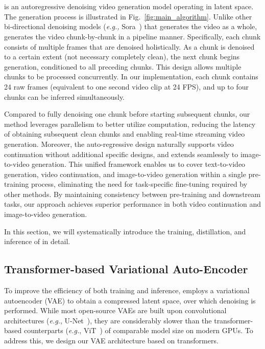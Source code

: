 \section{\magi}

\magi is an autoregressive denoising video generation model operating in latent space. The generation process is illustrated in Fig.~\ref{fig:main_algorithm}. Unlike other bi-directional denoising models (\emph{e.g.,} Sora~\citep{openaisora2024}) that generates the video as a whole, \magi generates the video chunk-by-chunk in a pipeline manner. Specifically, each chunk consists of multiple frames that are denoised holistically. As a chunk is denoised to a certain extent (not necessary completely clean), the next chunk begins generation, conditioned to all preceding chunks. This design allows multiple chunks to be processed concurrently. In our implementation, each chunk contains 24 raw frames (equivalent to one second video clip at 24 FPS), and up to four chunks can be inferred simultaneously.

Compared to fully denoising one chunk before starting subsequent chunks, our method leverages parallelism to better utilize computation, reducing the latency of obtaining subsequent clean chunks and enabling real-time streaming video generation. Moreover, the auto-regressive design naturally supports video continuation without additional specific designs, and extends seamlessly to image-to-video generation. This unified framework enables us to cover text-to-video generation, video continuation, and image-to-video generation within a single pre-training process, eliminating the need for task-specific fine-tuning required by other methods. By maintaining consistency between pre-training and downstream tasks, our approach achieves superior performance in both video continuation and image-to-video generation. 

In this section, we will systematically introduce the training, distillation, and inference of \magi in detail.


\subsection{Transformer-based Variational Auto-Encoder}
To improve the efficiency of both training and inference, \magi employs a variational autoencoder (VAE) to obtain a compressed latent space, over which denoising is performed. While most open-source VAEs are built upon convolutional architectures (\emph{e.g.}, U-Net~\citep{ronneberger2015u}), they are considerably slower than the transformer-based counterparts (\emph{e.g.}, ViT~\citep{dosovitskiy2020image}) of comparable model size on modern GPUs. To address this, we design our VAE architecture based on transformers.

